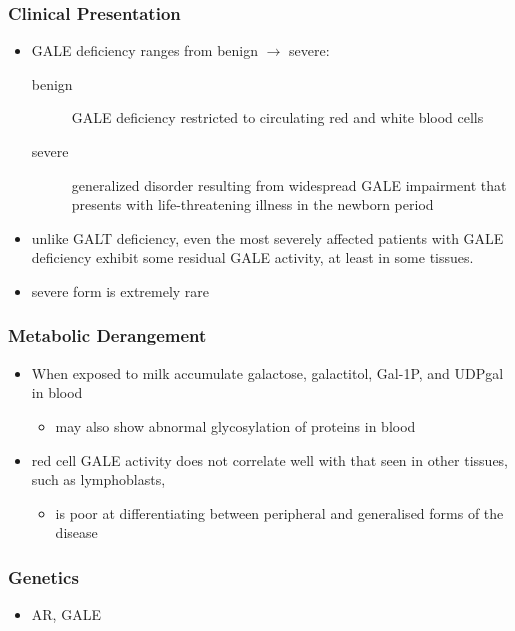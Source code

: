 \documentclass{scrartcl}
\begin{document}
\subsubsection{Clinical Presentation}
\label{sec:org5e58cf4}
\begin{itemize}
\item GALE deficiency ranges from benign \(\to\) severe:
\begin{description}
\item[{benign}] GALE deficiency restricted to circulating red and white blood cells
\item[{severe}] generalized disorder resulting from widespread GALE
impairment that presents with life-threatening illness
in the newborn period
\end{description}

\item unlike GALT deficiency, even the most severely affected patients
with GALE deficiency exhibit some residual GALE activity, at least
in some tissues.
\item severe form is extremely rare
\end{itemize}

\subsubsection{Metabolic Derangement}
\label{sec:orgffade59}
\begin{itemize}
\item When exposed to milk accumulate galactose, galactitol, Gal-1P, and
UDPgal in blood
\begin{itemize}
\item may also show abnormal glycosylation of proteins in blood
\end{itemize}
\item red cell GALE activity does not correlate well with that seen in
other tissues, such as lymphoblasts,
\begin{itemize}
\item is poor at differentiating between peripheral and generalised forms of the disease
\end{itemize}
\end{itemize}

\subsubsection{Genetics}
\label{sec:org4080c86}
\begin{itemize}
\item AR, GALE
\end{itemize}
\end{document}
